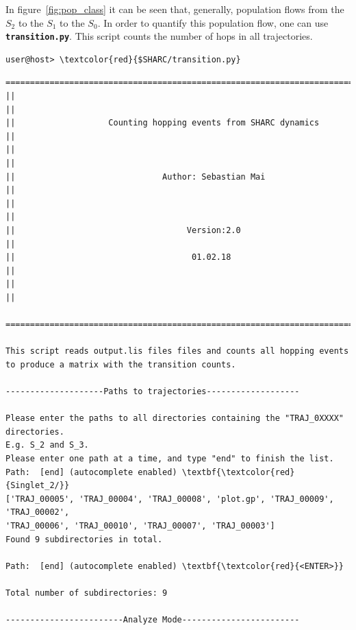 \documentclass[a4paper,11pt,DIV=15,openany]{scrbook}
\newcommand{\ttt}[1]{\textbf{\texttt{#1}}}
\begin{document}
In figure~\ref{fig:pop_class} it can be seen that, generally, population flows from the $S_2$ to the $S_1$ to the $S_0$.
In order to quantify this population flow, one can use \ttt{transition.py}.
This script counts the number of hops in all trajectories.

\begin{Verbatim}[commandchars=\\\{\}]
user@host> \textcolor{red}{$SHARC/transition.py}
\end{Verbatim}

\begin{oframed}
\footnotesize\begin{Verbatim}[commandchars=\\\{\}]
  ================================================================================
||                                                                                ||
||                   Counting hopping events from SHARC dynamics                  ||
||                                                                                ||
||                              Author: Sebastian Mai                             ||
||                                                                                ||
||                                   Version:2.0                                  ||
||                                    01.02.18                                    ||
||                                                                                ||
  ================================================================================

This script reads output.lis files files and counts all hopping events
to produce a matrix with the transition counts.
  
--------------------Paths to trajectories-------------------

Please enter the paths to all directories containing the "TRAJ_0XXXX" directories.
E.g. S_2 and S_3. 
Please enter one path at a time, and type "end" to finish the list.
Path:  [end] (autocomplete enabled) \textbf{\textcolor{red}{Singlet_2/}}
['TRAJ_00005', 'TRAJ_00004', 'TRAJ_00008', 'plot.gp', 'TRAJ_00009', 'TRAJ_00002', 
'TRAJ_00006', 'TRAJ_00010', 'TRAJ_00007', 'TRAJ_00003']
Found 9 subdirectories in total.

Path:  [end] (autocomplete enabled) \textbf{\textcolor{red}{<ENTER>}}

Total number of subdirectories: 9

------------------------Analyze Mode------------------------


\end{Verbatim}
\end{oframed}
\end{document}
